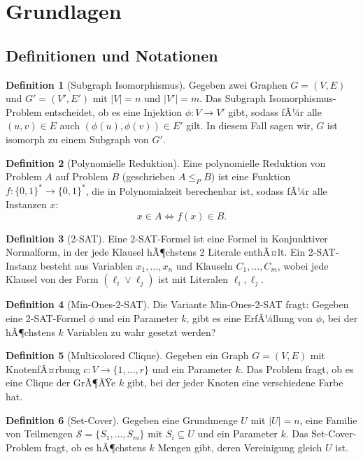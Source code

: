 ﻿\documentclass[a4paper,12pt]{article}
\theoremstyle{definition}
\newtheorem{definition}{Definition}[section]
\begin{document}
\section{Grundlagen}

\subsection{Definitionen und Notationen}

\begin{definition}[Subgraph Isomorphismus]
	Gegeben zwei Graphen $G = (V, E)$ und $G' = (V', E')$ mit $|V| = n$ und $|V'| = m$. Das Subgraph Isomorphismus-Problem entscheidet, ob es eine Injektion $\phi: V \to V'$ gibt, sodass fÃ¼r alle $(u,v) \in E$ auch $(\phi(u), \phi(v)) \in E'$ gilt. In diesem Fall sagen wir, $G$ ist isomorph zu einem Subgraph von $G'$.
\end{definition}

\begin{definition}[Polynomielle Reduktion]
	Eine polynomielle Reduktion von Problem $A$ auf Problem $B$ (geschrieben $A \leq_P B$) ist eine Funktion $f: \{0,1\}^* \to \{0,1\}^*$, die in Polynomialzeit berechenbar ist, sodass fÃ¼r alle Instanzen $x$:
	\[
	x \in A \iff f(x) \in B.
	\]
\end{definition}

\begin{definition}[2-SAT]
	Eine 2-SAT-Formel ist eine Formel in Konjunktiver Normalform, in der jede Klausel hÃ¶chstens 2 Literale enthÃ¤lt. Ein 2-SAT-Instanz besteht aus Variablen $x_1, \ldots, x_n$ und Klauseln $C_1, \ldots, C_m$, wobei jede Klausel von der Form $(\ell_i \lor \ell_j)$ ist mit Literalen $\ell_i, \ell_j$.
\end{definition}

\begin{definition}[Min-Ones-2-SAT]
	Die Variante Min-Ones-2-SAT fragt: Gegeben eine 2-SAT-Formel $\phi$ und ein Parameter $k$, gibt es eine ErfÃ¼llung von $\phi$, bei der hÃ¶chstens $k$ Variablen zu wahr gesetzt werden?
\end{definition}

\begin{definition}[Multicolored Clique]
	Gegeben ein Graph $G = (V, E)$ mit KnotenfÃ¤rbung $c: V \to \{1, \ldots, r\}$ und ein Parameter $k$. Das Problem fragt, ob es eine Clique der GrÃ¶ÃŸe $k$ gibt, bei der jeder Knoten eine verschiedene Farbe hat.
\end{definition}

\begin{definition}[Set-Cover]
	Gegeben eine Grundmenge $U$ mit $|U| = n$, eine Familie von Teilmengen $\mathcal{S} = \{S_1, \ldots, S_m\}$ mit $S_i \subseteq U$ und ein Parameter $k$. Das Set-Cover-Problem fragt, ob es hÃ¶chstens $k$ Mengen gibt, deren Vereinigung gleich $U$ ist.
\end{definition}
\end{document}
